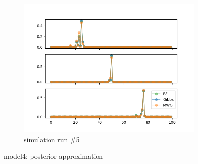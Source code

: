 \begin{figure}[H]
\begin{subfigure}{.3\textwidth}
    	\includegraphics[width=\linewidth]{../../plots/Posterior_post_burnin_M4_N100_NMCMC3_seed4_diffind2.png}
    	\caption{simulation run \#5}
	\end{subfigure}
	\caption{model4: posterior approximation}
\end{figure}

